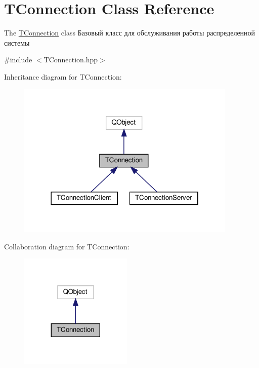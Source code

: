 \hypertarget{class_t_connection}{}\section{T\+Connection Class Reference}
\label{class_t_connection}


The \hyperlink{class_t_connection}{T\+Connection} class Базовый класс для обслуживания работы распределенной системы  




{\ttfamily \#include $<$T\+Connection.\+hpp$>$}



Inheritance diagram for T\+Connection\+:
\nopagebreak
\begin{figure}[H]
\begin{center}
\leavevmode
\includegraphics[width=298pt]{class_t_connection__inherit__graph}
\end{center}
\end{figure}


Collaboration diagram for T\+Connection\+:
\nopagebreak
\begin{figure}[H]
\begin{center}
\leavevmode
\includegraphics[width=152pt]{class_t_connection__coll__graph}
\end{center}
\end{figure}
